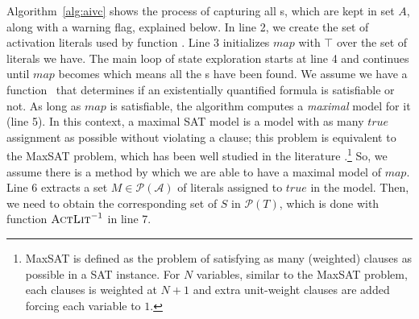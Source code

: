 Algorithm~\ref{alg:aivc} shows the process of capturing all \mivc s,
which are kept in set $A$, along with a warning flag, explained below.
In line 2, we create the set of activation
literals used by function \actlit . Line 3 initializes $map$ with
$\top$ over the set of literals we have. The main loop of state
exploration starts at line 4 and continues until $map$ becomes \unsat
which means all the \mivc s have been found. We assume we have a
function \checksat ~that determines if an existentially quantified
formula is satisfiable or not.
As long as $map$ is satisfiable, the algorithm computes a
\emph{maximal} \sat model for it (line 5). In this context,  a maximal SAT model is a
model with as many $true$ assignment as possible without violating a
clause; this problem is equivalent
to the MaxSAT problem, which has been well studied in the
literature \cite{davies2011solving,
  morgado2013iterative}.\footnote{MaxSAT is defined as the problem of satisfying as many
(weighted) clauses as possible in a SAT instance. For $N$
variables, similar to the MaxSAT problem, each clauses is weighted at $N+1$ and extra unit-weight clauses are added forcing each variable to $1$.} So, we assume there is a method by which we
are able to have a maximal model of $map$. Line 6 extracts a set $M
\in \mathcal{P} (\mathcal{A})$ of literals assigned to $true$ in the
model. Then, we need to obtain the corresponding set of $S$ in
$\mathcal{P}(T)$, which is done with function $\textsc{ActLit} ^{-1}$ in line
7.


